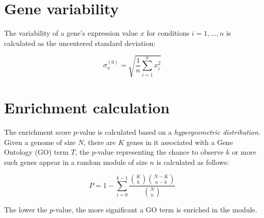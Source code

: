 \section{Gene variability}\label{apd:gene-sd}

The variability of a gene's expression value $x$ for conditions $i=1,…,n$ is  calculated as the uncentered standard deviation: 

\begin{equation}
\sigma_x^{(0)}=\sqrt{\frac{1}{n}\sum\limits_{i=1}^{n}x_i^2}
\end{equation}


\section{Enrichment calculation}\label{apd:enrichment}

The enrichment score $p$-value is calculated based on a \textit{hypergeometric distribution}. Given a genome of size $N$, there are $K$ genes in it associated with a Gene Ontology (GO) term $T$, the $p$-value representing the chance to observe $k$ or more such genes appear in a random module of size $n$ is calculated as follows:

\begin{equation}
P = 1-\sum\limits_{i=0}^{k-1}\frac{\binom{K}{k}\binom{N-K}{n-k}}{\binom{N}{n}}
\end{equation}

The lower the $p$-value, the more significant a GO term is enriched in the module.



\cleardoublepage

